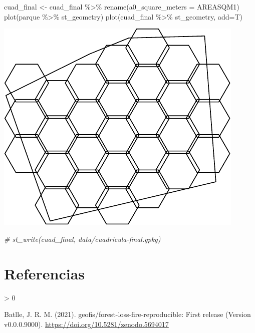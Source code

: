 \documentclass[
  11pt,
]{article}
\newenvironment{Shaded}{\begin{snugshade}}{\end{snugshade}}
\newcommand{\AttributeTok}[1]{\textcolor[rgb]{0.77,0.63,0.00}{#1}}
\newcommand{\CommentTok}[1]{\textcolor[rgb]{0.56,0.35,0.01}{\textit{#1}}}
\newcommand{\FunctionTok}[1]{\textcolor[rgb]{0.00,0.00,0.00}{#1}}
\newcommand{\NormalTok}[1]{#1}
\newcommand{\OtherTok}[1]{\textcolor[rgb]{0.56,0.35,0.01}{#1}}
\newcommand{\SpecialCharTok}[1]{\textcolor[rgb]{0.00,0.00,0.00}{#1}}
\newlength{\cslhangindent}
\newenvironment{CSLReferences}[2] %
 {%
  \setlength{\parindent}{0pt}
  \ifodd #1 \everypar{\setlength{\hangindent}{\cslhangindent}}\ignorespaces\fi
  \ifnum #2 > 0
  \setlength{\parskip}{#2\baselineskip}
  \fi
 }%
 {}
\begin{document}
\begin{Shaded}
\begin{Highlighting}[]
\NormalTok{cuad\_final }\OtherTok{\textless{}{-}}\NormalTok{ cuad\_final }\SpecialCharTok{\%\textgreater{}\%} \FunctionTok{rename}\NormalTok{(}\AttributeTok{a0\_square\_meters =}\NormalTok{ AREASQM1)}
\FunctionTok{plot}\NormalTok{(parque }\SpecialCharTok{\%\textgreater{}\%}\NormalTok{ st\_geometry)}
\FunctionTok{plot}\NormalTok{(cuad\_final }\SpecialCharTok{\%\textgreater{}\%}\NormalTok{ st\_geometry, }\AttributeTok{add=}\NormalTok{T)}
\end{Highlighting}
\end{Shaded}

\includegraphics{README_files/figure-latex/unnamed-chunk-3-2.pdf}

\begin{Shaded}
\begin{Highlighting}[]
\CommentTok{\# st\_write(cuad\_final, \textquotesingle{}data/cuadricula{-}final.gpkg\textquotesingle{})}
\end{Highlighting}
\end{Shaded}

\hypertarget{referencias}{%
\section*{Referencias}\label{referencias}}

\hypertarget{refs}{}
\begin{CSLReferences}{1}{0}
\leavevmode\hypertarget{ref-jose_ramon_martinez_batlle_2021_5694017}{}%
Batlle, J. R. M. (2021). {geofis/forest-loss-fire-reproducible: First
release} (Version v0.0.0.9000).
\url{https://doi.org/10.5281/zenodo.5694017}

\end{CSLReferences}
\end{document}
